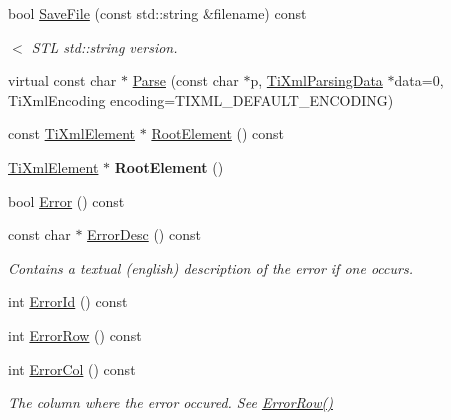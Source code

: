 \begin{DoxyCompactItemize}
\item 
\hypertarget{class_ti_xml_document_a2b3d316ed658852876d4852cd39c42d8}{}\label{class_ti_xml_document_a2b3d316ed658852876d4852cd39c42d8} 
bool \hyperlink{class_ti_xml_document_a2b3d316ed658852876d4852cd39c42d8}{Save\+File} (const std\+::string \&filename) const
\begin{DoxyCompactList}\small\item\em $<$ S\+TL std\+::string version. \end{DoxyCompactList}\item 
virtual const char $\ast$ \hyperlink{class_ti_xml_document_a789ad2f06f93d52bdb5570b2f3670289}{Parse} (const char $\ast$p, \hyperlink{class_ti_xml_parsing_data}{Ti\+Xml\+Parsing\+Data} $\ast$data=0, Ti\+Xml\+Encoding encoding=T\+I\+X\+M\+L\+\_\+\+D\+E\+F\+A\+U\+L\+T\+\_\+\+E\+N\+C\+O\+D\+I\+NG)
\item 
const \hyperlink{class_ti_xml_element}{Ti\+Xml\+Element} $\ast$ \hyperlink{class_ti_xml_document_ab54e3a93279fcf0ac80f06ed9c52f04a}{Root\+Element} () const
\item 
\hypertarget{class_ti_xml_document_a0b43e762a23f938b06651bc90b8a1013}{}\label{class_ti_xml_document_a0b43e762a23f938b06651bc90b8a1013} 
\hyperlink{class_ti_xml_element}{Ti\+Xml\+Element} $\ast$ {\bfseries Root\+Element} ()
\item 
bool \hyperlink{class_ti_xml_document_a348e68faad4a3498f413c51ee9bc321a}{Error} () const
\item 
\hypertarget{class_ti_xml_document_aab511be262e84a003e3bb86f0215c8c2}{}\label{class_ti_xml_document_aab511be262e84a003e3bb86f0215c8c2} 
const char $\ast$ \hyperlink{class_ti_xml_document_aab511be262e84a003e3bb86f0215c8c2}{Error\+Desc} () const
\begin{DoxyCompactList}\small\item\em Contains a textual (english) description of the error if one occurs. \end{DoxyCompactList}\item 
int \hyperlink{class_ti_xml_document_abd928b49a646c8ed53e0453c555d96a2}{Error\+Id} () const
\item 
int \hyperlink{class_ti_xml_document_a062e5257128a7da31b0b2e38cd524600}{Error\+Row} () const
\item 
\hypertarget{class_ti_xml_document_adea69de889449a2587afb8ee043f43f5}{}\label{class_ti_xml_document_adea69de889449a2587afb8ee043f43f5} 
int \hyperlink{class_ti_xml_document_adea69de889449a2587afb8ee043f43f5}{Error\+Col} () const
\begin{DoxyCompactList}\small\item\em The column where the error occured. See \hyperlink{class_ti_xml_document_a062e5257128a7da31b0b2e38cd524600}{Error\+Row()} \end{DoxyCompactList}\item 

\end{DoxyCompactItemize}

